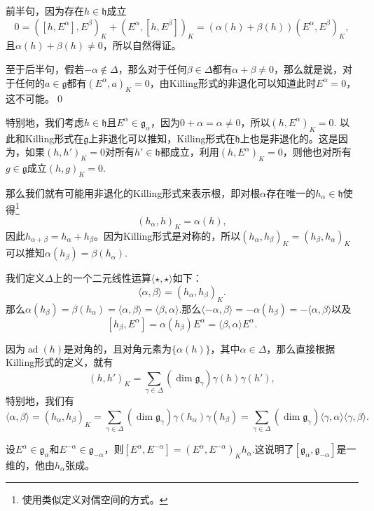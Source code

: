 \documentclass[9pt]{extarticle}
\newcommand{\lag}{{\mathfrak{g}}}
\DeclareMathOperator{\ad}{ad}
\begin{document}
\proof 前半句，因为存在$h\in\mathfrak{h}$成立
\[
	0=([h,E^\alpha],E^\beta)_K+(E^\alpha,[h,E^\beta])_K=(\alpha(h)+\beta(h))(E^\alpha,E^\beta)_K,
\]
且$\alpha(h)+\beta(h)\neq 0$，所以自然得证。

至于后半句，假若$-\alpha\notin\Delta$，那么对于任何$\beta\in\Delta$都有$\alpha+\beta\neq 0$，那么就是说，对于任何的$a\in \lag$都有$(E^\alpha,a)_K=0$，由Killing形式的非退化可以知道此时$E^\alpha=0$，这不可能。\qed


\para 特别地，我们考虑$h\in \mathfrak{h}$且$E^\alpha\in \lag_\alpha$，因为$0+\alpha=\alpha\neq 0$，所以$(h,E^\alpha)_K=0$. 以此和Killing形式在$\mathfrak{g}$上非退化可以推知，Killing形式在$\mathfrak{h}$上也是非退化的。这是因为，如果$(h,h')_K=0$对所有$h'\in \mathfrak{h}$都成立，利用$(h,E^\alpha)_K=0$，则他也对所有$g\in \lag$成立$(h,g)_K=0$.

那么我们就有可能用非退化的Killing形式来表示根，即对根$\alpha$存在唯一的$h_\alpha\in\mathfrak{h}$使得\footnote{使用类似定义对偶空间的方式。}
\[
	(h_\alpha,h)_K=\alpha(h),
\]
因此$h_{\alpha+\beta}=h_\alpha+h_\beta$。因为Killing形式是对称的，所以$(h_\alpha,h_\beta)_K=(h_\beta,h_\alpha)_K$可以推知$\alpha(h_\beta)=\beta(h_\alpha)$.

\para 我们定义$\Delta$上的一个二元线性运算$\langle \star,\star \rangle$如下：
\[
	\langle \alpha,\beta \rangle=(h_\alpha,h_\beta)_K.
\]
那么$\alpha(h_\beta)=\beta(h_\alpha)=\langle \alpha,\beta \rangle=\langle \beta,\alpha \rangle$.那么$\langle -\alpha,\beta \rangle=-\alpha(h_\beta)=-\langle \alpha,\beta \rangle$以及
\[
	[h_\beta,E^\alpha]=\alpha(h_\beta)E^\alpha=\langle \beta,\alpha \rangle E^\alpha.
\]

因为$\ad(h)$是对角的，且对角元素为$\{\alpha(h)\}$，其中$\alpha\in\Delta$，那么直接根据Killing形式的定义，就有
\[
	(h,h')_K=\sum_{\gamma \in \Delta}(\dim \lag_\gamma)\gamma(h)\gamma(h'),
\]
特别地，我们有
\[
	\langle \alpha,\beta \rangle=(h_\alpha,h_\beta)_K=\sum_{\gamma \in \Delta}(\dim \lag_\gamma)\gamma(h_\alpha)\gamma(h_\beta)=\sum_{\gamma \in \Delta}(\dim \lag_\gamma)\langle \gamma,\alpha\rangle\langle \gamma,\beta\rangle.
\]

\pro 设$E^\alpha \in \lag_\alpha$和$E^{-\alpha} \in \lag_{-\alpha}$，则$[E^{\alpha},E^{-\alpha}]=(E^{\alpha},E^{-\alpha})_Kh_\alpha$.这说明了$[\lag_{\alpha},\lag_{-\alpha}]$是一维的，他由$h_\alpha$张成。
\end{document}
